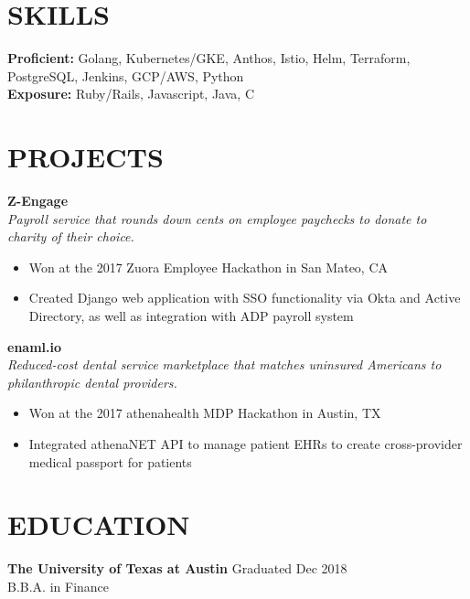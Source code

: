 \documentclass{resume}
\begin{document}
\section{SKILLS}
\textbf{Proficient:} Golang, Kubernetes/GKE, Anthos, Istio, Helm, Terraform, PostgreSQL, Jenkins, GCP/AWS, Python\\
\textbf{Exposure:} Ruby/Rails, Javascript, Java, C
\vspace{5pt}

\section{PROJECTS}
\textbf{Z-Engage}\\
\emph{Payroll service that rounds down cents on employee paychecks to donate to charity of their choice.}
\begin{itemize}\itemsep0.3em
\item Won at the 2017 Zuora Employee Hackathon in San Mateo, CA
\item Created Django web application with SSO functionality via Okta and Active Directory, as well as integration with ADP payroll system
\end{itemize}\vspace{5pt}

\textbf{enaml.io}\\
\emph{Reduced-cost dental service marketplace that matches uninsured Americans to philanthropic dental providers.}
\begin{itemize}\itemsep0.3em
\item Won at the 2017 athenahealth MDP Hackathon in Austin, TX
\item Integrated athenaNET API to manage patient EHRs to create cross-provider medical passport for patients
\end{itemize}\vspace{5pt}

\section{EDUCATION}
\textbf{The University of Texas at Austin} \hfill {Graduated Dec 2018}\\
B.B.A. in Finance
\end{document}
